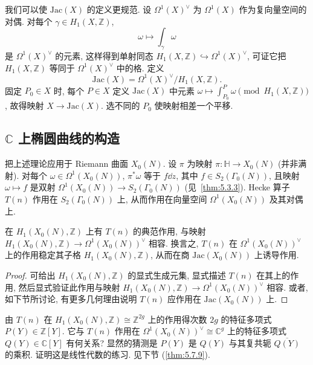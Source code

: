 我们可以使 $\mathrm{Jac}(X)$ 的定义更规范. 设 $\Omega^1(X)^{\vee}$ 为 $\Omega^1(X)$ 作为复向量空间的对偶. 对每个 $\gamma\in H_1(X, \mathbb{Z})$,
\[
\omega\mapsto\int_{\gamma}\omega
\]
是 $\Omega^1(X)^{\vee}$ 的元素, 这样得到单射同态 $H_1(X, \mathbb{Z})\hookrightarrow\Omega^1(X)^{\vee}$, 可证它把 $H_1(X, \mathbb{Z})$ 等同于 $\Omega^1(X)^{\vee}$ 中的格. 定义
\[
\mathrm{Jac}(X) = \Omega^1(X)^{\vee}/H_1(X, \mathbb{Z}).
\]
固定 $P_0\in X$ 时, 每个 $P\in X$ 定义 $\mathrm{Jac}(X)$ 中元素 $\omega\mapsto\int_{P_0}^{P}\omega \pmod{H_1(X, \mathbb{Z})}$, 故得映射 $X\to\mathrm{Jac}(X)$. 选不同的 $P_0$ 使映射相差一个平移.

\subsection*{$\mathbb{C}$ 上椭圆曲线的构造}

把上述理论应用于 Riemann 曲面 $X_0(N)$. 设 $\pi$ 为映射 $\pi\colon\mathbb{H}\to X_0(N)$ (并非满射). 对每个 $\omega\in\Omega^1(X_0(N))$, $\pi^*\omega$ 等于 $f\dd z$, 其中 $f\in S_2(\Gamma_0(N))$, 且映射 $\omega\mapsto f$ 是双射 $\Omega^1(X_0(N))\to S_2(\Gamma_0(N))$ (见~\ref{thm:5.3.3}). Hecke 算子 $T(n)$ 作用在 $S_2(\Gamma_0(N))$ 上, 从而作用在向量空间 $\Omega^1(X_0(N))$ 及其对偶上.

\begin{proposition} \label{thm:5.6.1} 
在 $H_1(X_0(N), \mathbb{Z})$ 上有 $T(n)$ 的典范作用, 与映射 $H_1(X_0(N), \mathbb{Z})\to\Omega^1(X_0(N))^{\vee}$ 相容. 换言之, $T(n)$ 在 $\Omega^1(X_0(N))^{\vee}$ 上的作用稳定其子格 $H_1(X_0(N), \mathbb{Z})$, 从而在商 $\mathrm{Jac}(X_0(N))$ 上诱导作用.
\end{proposition}

\begin{proof}
可给出 $H_1(X_0(N), \mathbb{Z})$ 的显式生成元集, 显式描述 $T(n)$ 在其上的作用, 然后显式验证此作用与映射 $H_1(X_0(N), \mathbb{Z})\to\Omega^1(X_0(N))^{\vee}$ 相容. 或者, 如下节所讨论, 有更多几何理由说明 $T(n)$ 应作用在 $\mathrm{Jac}(X_0(N))$ 上.
\end{proof}

\begin{remark} \label{thm:5.6.2} 
由 $T(n)$ 在 $H_1(X_0(N), \mathbb{Z})\cong\mathbb{Z}^{2g}$ 上的作用得次数 $2g$ 的特征多项式 $P(Y)\in\mathbb{Z}[Y]$. 它与 $T(n)$ 作用在 $\Omega^1(X_0(N))^{\vee}\cong\mathbb{C}^g$ 上的特征多项式 $Q(Y)\in\mathbb{C}[Y]$ 有何关系? 显然的猜测是 $P(Y)$ 是 $Q(Y)$ 与其复共轭 $\overline{Q(Y)}$ 的乘积. 证明这是线性代数的练习. 见下节 (\ref{thm:5.7.9}).
\end{remark}

